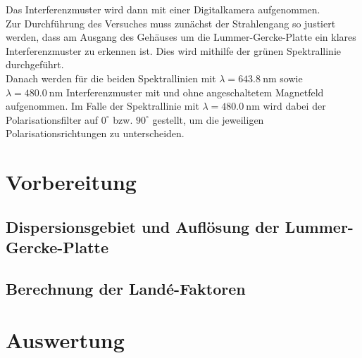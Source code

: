 \documentclass[captions=tableheading]{scrartcl}
\begin{document}
Das Interferenzmuster wird dann mit einer Digitalkamera aufgenommen.\\
Zur Durchführung des Versuches muss zunächst der Strahlengang so justiert werden, dass am Ausgang des Gehäuses um die Lummer-Gercke-Platte ein klares Interferenzmuster zu erkennen ist. Dies wird mithilfe der grünen Spektrallinie durchgeführt. \\
Danach werden für die beiden Spektrallinien mit $\lambda=\SI{643.8}{\nano\metre}$ sowie $\lambda=\SI{480.0}{\nano\metre}$ Interferenzmuster mit und ohne angeschaltetem Magnetfeld aufgenommen. Im Falle der Spektrallinie mit $\lambda=\SI{480.0}{\nano\metre}$ wird dabei der Polarisationsfilter auf $0^{\circ}$ bzw. $90^{\circ}$ gestellt, um die jeweiligen Polarisationsrichtungen zu unterscheiden.

\section{Vorbereitung}

\subsection{Dispersionsgebiet und Auflösung der Lummer-Gercke-Platte}

\subsection{Berechnung der Landé-Faktoren}

\section{Auswertung}
\end{document}
